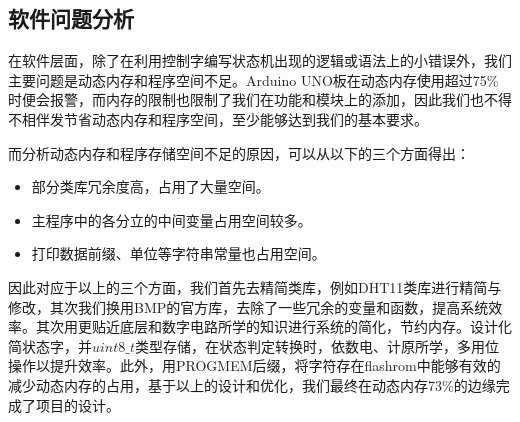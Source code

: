 \subsection{软件问题分析}
\par{} 在软件层面，除了在利用控制字编写状态机出现的逻辑或语法上的小错误外，我们主要问题是动态内存和程序空间不足。Arduino UNO板在动态内存使用超过75\%时便会报警，而内存的限制也限制了我们在功能和模块上的添加，因此我们也不得不相伴发节省动态内存和程序空间，至少能够达到我们的基本要求。

\par{} 而分析动态内存和程序存储空间不足的原因，可以从以下的三个方面得出：
\begin{itemize}
\item 部分类库冗余度高，占用了大量空间。
\item 主程序中的各分立的中间变量占用空间较多。
\item 打印数据前缀、单位等字符串常量也占用空间。
\end{itemize}

\par{} 因此对应于以上的三个方面，我们首先去精简类库，例如DHT11类库进行精简与修改，其次我们换用BMP的官方库，去除了一些冗余的变量和函数，提高系统效率。其次用更贴近底层和数字电路所学的知识进行系统的简化，节约内存。设计化简状态字，并$uint8\_t$类型存储，在状态判定转换时，依数电、计原所学，多用位操作以提升效率。此外，用PROGMEM后缀，将字符存在flashrom中能够有效的减少动态内存的占用，基于以上的设计和优化，我们最终在动态内存73\%的边缘完成了项目的设计。